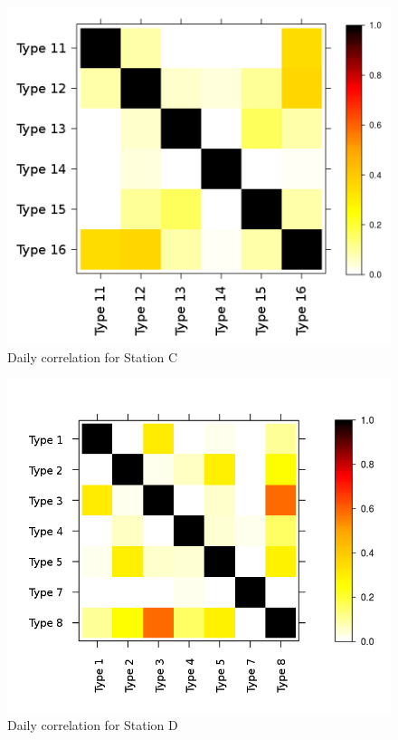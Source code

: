 \begin{figure}[htb]
 \centering
 \includegraphics[width=\textwidth]{./img/segovia_corr.png}
 \caption{Daily correlation for Station C} \label{fig:segovia_corr}
\end{figure}
\begin{figure}[htb]
 \centering
 \includegraphics[width=\textwidth]{./img/sevilla_corr.png}
 \caption{Daily correlation for Station D} \label{fig:sevilla_corr}
\end{figure}

